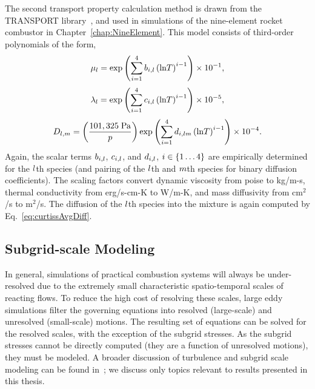 The second transport property calculation method is drawn from the TRANSPORT library~\cite{Kee1998}, and used in simulations of the nine-element rocket combustor in Chapter~\ref{chap:NineElement}. This model consists of third-order polynomials of the form,
%
\begin{equation}
	\mu_{l} = \text{exp} \left( \sum_{i=1}^4 b_{i,l} \left(\text{ln}T\right)^{i - 1} \right) \times 10^{-1},
\end{equation}
%
\begin{equation}
	\lambda_{l} = \text{exp} \left( \sum_{i=1}^4 c_{i,l} \left(\text{ln}T\right)^{i - 1} \right) \times 10^{-5},
\end{equation}
%
\begin{equation}
	D_{l, m} = \left(\frac{101,325 \; \text{Pa}}{p}\right) \text{exp} \left( \sum_{i=1}^4 d_{i,l m} \left(\text{ln}T\right)^{i - 1} \right) \times 10^{-4}.
\end{equation}
%
Again, the scalar terms $b_{i,l}$, $c_{i,l}$, and $d_{i,l}$, $i \in \{1 \hdots 4\}$ are empirically determined for the $l$th species (and pairing of the $l$th and $m$th species for binary diffusion coefficients). The scaling factors convert dynamic viscosity from poise to kg/m-s, thermal conductivity from erg/s-cm-K to W/m-K, and mass diffusivity from cm$^2$/s to m$^2$/s. The diffusion of the $l$th species into the mixture is again computed by Eq.~\ref{eq:curtissAvgDiff}.

\subsection{Subgrid-scale Modeling}

In general, simulations of practical combustion systems will always be under-resolved due to the extremely small characteristic spatio-temporal scales of reacting flows. To reduce the high cost of resolving these scales, large eddy simulations filter the governing equations into resolved (large-scale) and unresolved (small-scale) motions. The resulting set of equations can be solved for the resolved scales, with the exception of the subgrid stresses. As the subgrid stresses cannot be directly computed (they are a function of unresolved motions), they must be modeled. A broader discussion of turbulence and subgrid scale modeling can be found in~\cite{Pope2000}; we discuss only topics relevant to results presented in this thesis.

